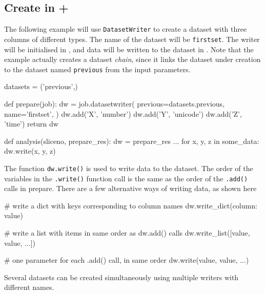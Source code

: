 \subsection{Create in \prepare + \analysis}
\label{sec:create_dataset_in_analysis}
The following example will use \texttt{DatasetWriter} to create a
dataset with three columns of different types.  The name of the
dataset will be \texttt{firstset}.  The writer will be initialised
in \prepare, and data will be written to the dataset in \analysis.
Note that the example actually creates a dataset \emph{chain}, since
it links the dataset under creation to the dataset
named \texttt{previous} from the input parameters.
\begin{python}
datasets = ('previous',)

def prepare(job):
    dw = job.datasetwriter(
        previous=datasets.previous,
        name='firstset',
    )
    dw.add('X', 'number')
    dw.add('Y', 'unicode')
    dw.add('Z', 'time')
    return dw

def analysis(sliceno, prepare_res):
    dw = prepare_res
    ...
    for x, y, z in some_data:
        dw.write(x, y, z)
\end{python}
The function \texttt{dw.write()} is used to write data to the dataset.
The order of the variables in the \texttt{.write()} function call is
the same as the order of the \texttt{.add()} calls in prepare.  There
are a few alternative ways of writing data, as shown here
\begin{python}
# write a dict with keys corresponding to column names
dw.write_dict({column: value})

# write a list with items in same order as dw.add() calls
dw.write_list([value, value, ...])

# one parameter for each .add() call, in same order
dw.write(value, value, ...)
\end{python}
Several datasets can be created simultaneously using multiple writers
with different names.



